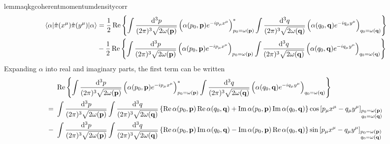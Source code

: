 \begin{restatable}{lemma}{qkgcoherentmomentumdensitycorr}\label{thm:qkg_coherent_momentum_density_corr}
	\begin{equation}
		\begin{split}
			\expval{\hat\pi(x^\mu)\hat\pi(y^\mu)}{\alpha}
			&=
			\frac{1}{2}
			\operatorname{\operatorname{Re}}\left\{
				\int\frac{\dd[3]{p}}{(2\pi)^3\sqrt{2\omega(\vb{p})}}
				\left(
					\alpha(p_0,\vb{p})
					e^{-ip_\mu x^\mu}
				\right)^*_{p_0=\omega(\vb{p})}
				\int\frac{\dd[3]{q}}{(2\pi)^3\sqrt{2\omega(\vb{q})}}
				\left(
					\alpha(q_0,\vb{q})
					e^{-iq_\mu y^\mu}
				\right)_{q_0=\omega(\vb{q})}
			\right\}
			\\
			&-
			\frac{1}{2}
			\operatorname{\operatorname{Re}}\left\{
				\int\frac{\dd[3]{p}}{(2\pi)^3\sqrt{2\omega(\vb{p})}}
				\left(
					\alpha(p_0,\vb{p})
					e^{-ip_\mu x^\mu}
				\right)_{p_0=\omega(\vb{p})}
				\int\frac{\dd[3]{q}}{(2\pi)^3\sqrt{2\omega(\vb{q})}}
				\left(
					\alpha(q_0,\vb{q})
					e^{-iq_\mu y^\mu}
				\right)_{q_0=\omega(\vb{q})}
			\right\}
		\end{split}
	\end{equation}
	Expanding $\alpha$ into real and imaginary parts, the first term can be written
	\begin{equation*}
		\begin{split}
			&\
			\Re\left\{
				\int\frac{\dd[3]{p}}{(2\pi)^3\sqrt{2\omega(\vb{p})}}
				\left(
					\alpha(p_0,\vb{p})
					e^{-ip_\mu x^\mu}
				\right)^*_{p_0=\omega(\vb{p})}
				\int\frac{\dd[3]{q}}{(2\pi)^3\sqrt{2\omega(\vb{q})}}
				\left(
					\alpha(q_0,\vb{q})
					e^{-iq_\mu y^\mu}
				\right)_{q_0=\omega(\vb{q})}			
			\right\}
			\\
			=&\
			\int\frac{\dd[3]{p}}{(2\pi)^3\sqrt{2\omega(\vb{p})}}
			\int\frac{\dd[3]{q}}{(2\pi)^3\sqrt{2\omega(\vb{q})}}
			\left\{
				\Re\alpha(p_0,\vb{p})
				\Re\alpha(q_0,\vb{q})
				+
				\Im\alpha(p_0,\vb{p})
				\Im\alpha(q_0,\vb{q})
			\right\}
			\cos\left[
				p_\mu x^\mu
				-
				q_\mu y^\mu
			\right]_{\substack{p_0=\omega(\vb{p})\\q_0=\omega(\vb{q})}}
			\\
			-&\
			\int\frac{\dd[3]{p}}{(2\pi)^3\sqrt{2\omega(\vb{p})}}
			\int\frac{\dd[3]{q}}{(2\pi)^3\sqrt{2\omega(\vb{q})}}
			\left\{
				\Re\alpha(p_0,\vb{p})
				\Im\alpha(q_0,\vb{q})
				-
				\Im\alpha(p_0,\vb{p})
				\Re\alpha(q_0,\vb{q})
			\right\}
			\sin\left[
				p_\mu x^\mu
				-
				q_\mu y^\mu
			\right]_{\substack{p_0=\omega(\vb{p})\\q_0=\omega(\vb{q})}}
		\end{split}

\end{equation*}
\end{restatable}
